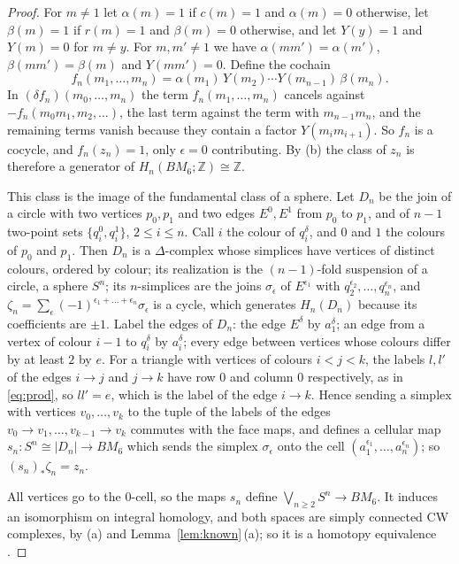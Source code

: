 \documentclass[11pt,a4paper]{article}
\theoremstyle{definition}
\newcommand{\Z}{\mathbb{Z}}
\begin{document}
\begin{proof}
For $m\ne1$ let $\alpha(m)=1$ if $c(m)=1$ and $\alpha(m)=0$ otherwise, let
$\beta(m)=1$ if $r(m)=1$ and $\beta(m)=0$ otherwise, and let $Y(y)=1$ and
$Y(m)=0$ for $m\neq y$. For $m,m'\ne1$ we have $\alpha(mm')=\alpha(m')$,
$\beta(mm')=\beta(m)$ and $Y(mm')=0$. Define the cochain
\[
 f_n(m_1,\dots,m_n)=\alpha(m_1)\,Y(m_2)\cdots Y(m_{n-1})\,\beta(m_n).
\]
In $(\delta f_n)(m_0,\dots,m_n)$ the term $f_n(m_1,\dots,m_n)$ cancels
against $-f_n(m_0m_1,m_2,\dots)$, the last term against the term with
$m_{n-1}m_n$, and the remaining terms vanish because they contain a factor
$Y(m_im_{i+1})$. So $f_n$ is a cocycle, and $f_n(z_n)=1$, only
$\epsilon=0$ contributing. By (b) the class of $z_n$ is therefore a
generator of $H_n(BM_6;\Z)\cong\Z$.

This class is the image of the fundamental class of a sphere. Let $D_n$ be
the join of a circle with two vertices $p_0,p_1$ and two edges $E^0,E^1$ from
$p_0$ to $p_1$, and of $n-1$ two-point sets $\{q_i^0,q_i^1\}$, $2\le i\le
n$. Call $i$ the colour of $q_i^\delta$, and $0$ and $1$ the colours of $p_0$
and $p_1$. Then $D_n$ is a $\Delta$-complex whose simplices have vertices of
distinct colours, ordered by colour; its realization is the $(n-1)$-fold
suspension of a circle, a sphere $S^n$; its $n$-simplices are the joins
$\sigma_\epsilon$ of $E^{\epsilon_1}$ with $q_2^{\epsilon_2},\dots,
q_n^{\epsilon_n}$, and $\zeta_n=\sum_\epsilon(-1)^{\epsilon_1+\dots+
\epsilon_n}\sigma_\epsilon$ is a cycle, which generates $H_n(D_n)$ because
its coefficients are $\pm1$. Label the edges of $D_n$: the edge $E^\delta$
by $a_1^\delta$; an edge from a vertex of colour $i-1$ to $q_i^\delta$ by
$a_i^\delta$; every edge between vertices whose colours differ by at least
$2$ by $e$. For a triangle with vertices of colours $i<j<k$, the labels
$l,l'$ of the edges $i\to j$ and $j\to k$ have row $0$ and column $0$
respectively, as in \eqref{eq:prod}, so $ll'=e$, which is the label of the
edge $i\to k$. Hence sending a simplex with vertices
$v_0,\dots,v_k$ to the tuple of the labels of the edges
$v_0\to v_1,\dots,v_{k-1}\to v_k$ commutes with the face maps, and defines a
cellular map $s_n\colon S^n\cong|D_n|\to BM_6$ which sends the simplex
$\sigma_\epsilon$ onto the cell $(a_1^{\epsilon_1},\dots,a_n^{\epsilon_n})$;
so $(s_n)_*\zeta_n=z_n$.

All vertices go to the $0$-cell, so the maps $s_n$ define
$\bigvee_{n\ge2}S^n\to BM_6$. It induces an isomorphism on integral
homology, and both spaces are simply connected CW complexes, by (a) and
Lemma~\ref{lem:known}\,(a); so it is a homotopy equivalence
\cite[Corollary~4.33]{Ha}.
\end{proof}
\end{document}
